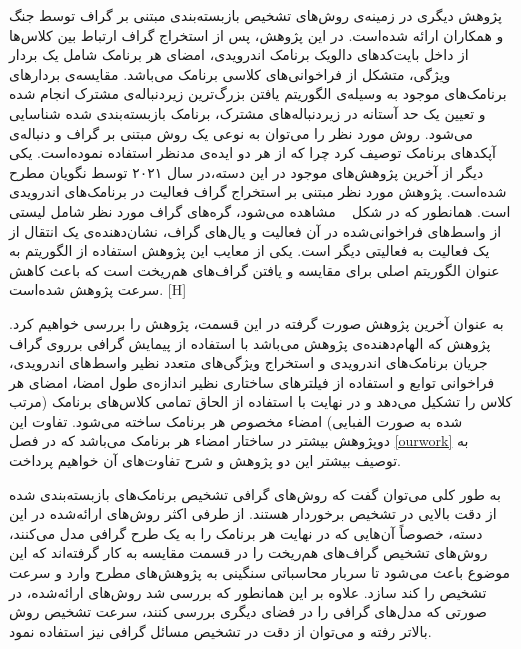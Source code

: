 پژوهش دیگری در زمینه‌ی روش‌های تشخیص بازبسته‌بندی مبتنی بر گراف توسط جنگ و همکاران ارائه شده‌است. در این پژوهش، پس از استخراج گراف ارتباط بین کلاس‌ها از داخل بایت‌کد‌های دالویک برنامک اندرویدی، امضای هر برنامک شامل یک بردار ویژگی، متشکل از فراخوانی‌‌های کلاسی برنامک می‌باشد. مقایسه‌ی بردار‌های برنامک‌های موجود به وسیله‌ی الگوریتم یافتن بزر‌گ‌ترین زیر‌دنباله‌ی مشترک‌ انجام شده و تعیین یک حد آستانه در زیر‌دنباله‌های مشترک، برنامک‌ بازبسته‌بندی شده شناسایی می‌شود. روش مورد نظر را می‌توان به نوعی یک روش مبتنی بر گراف و دنباله‌ی آپکد‌های برنامک توصیف کرد چرا که از هر دو ایده‌ی مدنظر استفاده نموده‌است. یکی دیگر از آخرین پژوهش‌های موجود در این دسته،‌در سال ۲۰۲۱ توسط نگویان مطرح شده‌است. پژوهش مورد نظر مبتنی بر استخراج گراف فعالیت‌‌ در برنامک‌های اندرویدی است. همانطور که در شکل ~ مشاهده می‌شود، گره‌های گراف مورد نظر شامل لیستی از واسط‌های فراخوانی‌شده در آن فعالیت و یال‌های گراف، نشان‌دهنده‌ی یک انتقال از یک فعالیت به فعالیتی دیگر‌ است. یکی از معایب این پژوهش استفاده از الگوریتم  به عنوان الگوریتم اصلی برای مقایسه‌ و یافتن گراف‌های هم‌ریخت است که باعث کاهش سرعت پژوهش شده‌است.
[H]
\vspace{1em}

به عنوان آخرین پژوهش صورت گرفته در این قسمت، پژوهش را بررسی خواهیم کرد. پژوهش  که الهام‌دهنده‌ی پژوهش  می‌باشد با استفاده از پیمایش گرافی برروی گراف‌ جریان برنامک‌های اندرویدی و استخراج ویژگی‌های متعدد نظیر واسط‌های اندرویدی، فراخوانی توابع و استفاده از فیلتر‌های ساختاری نظیر اندازه‌ی طول امضا، امضا‌ی هر کلاس را تشکیل می‌دهد و در نهایت با استفاده از الحاق تمامی کلاس‌های برنامک (مرتب شده به صورت الفبایی) امضا‌‌ء مخصوص هر برنامک ساخته می‌شود. تفاوت این دوپژوهش بیشتر در ساختار امضاء هر برنامک می‌باشد که در فصل
\ref{ourwork}
به توصیف بیشتر این دو پژوهش و شرح تفاوت‌های آن خواهیم پرداخت.

به طور کلی می‌توان گفت که روش‌های گرافی تشخیص برنامک‌های بازبسته‌بندی شده از دقت بالایی در تشخیص برخوردار هستند. از طرفی اکثر روش‌های ارائه‌شده در این دسته، خصوصاً آن‌هایی که در نهایت هر برنامک را به یک طرح گرافی مدل می‌کنند، روش‌های تشخیص گراف‌های هم‌ریخت را در قسمت مقایسه به کار گرفته‌اند که این موضوع باعث می‌شود تا سربار محاسباتی سنگینی به پژوهش‌های مطرح وارد و سرعت تشخیص را کند سازد. علاوه بر این همانطور که بررسی شد روش‌های ارائه‌شده، در صورتی که مدل‌های گرافی را در فضای دیگری بررسی کنند، سرعت تشخیص روش بالاتر رفته و می‌توان از دقت در تشخیص مسائل گرافی نیز استفاده نمود.


